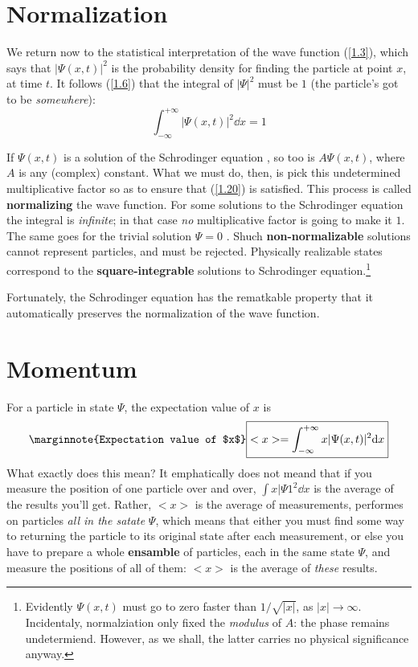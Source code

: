 \section{Normalization}
We return now to the statistical interpretation of the wave function (\ref{1.3}), which says that $|\Psi(x,t)|^2$ is the probability density for finding the particle at point $x$, at time $t$. It follows (\ref{1.6}) that the integral of $|\Psi|^2$ must be $1$ (the particle's got to be \textit{somewhere}):
\begin{equation}\label{1.20}
	\boxed{\int_{-\infty}^{+\infty}|\Psi(x,t)|^2\dd x=1}
\end{equation}

If $\Psi(x,t)$ is a solution of the Schrodinger equation , so too is $A\Psi(x,t)$, where $A$ is any (complex) constant. What we must do, then, is pick this undetermined multiplicative factor so as to ensure that (\ref{1.20}) is satisfied. This process is called \textbf{normalizing} the wave function. For some solutions to the Schrodinger equation the integral is \textit{infinite}; in that case \textit{no} multiplicative factor is going to make it $1$. The same goes for the trivial solution $\Psi=0$ . Shuch \textbf{non-normalizable} solutions cannot represent particles, and must be rejected. Physically realizable states correspond to the \textbf{square-integrable} solutions to Schrodinger equation.\footnote{Evidently $\Psi(x,t)$ must go to zero faster than $1/\sqrt{|x|}$, as $|x|\to\infty$. Incidentaly, normalziation only fixed the \textit{modulus} of $A$: the phase remains undetermiend. However, as we shall, the latter carries no physical significance anyway.}

Fortunately, the Schrodinger equation has the rematkable property that it automatically preserves the normalization of the wave function.

\section{Momentum}
For a particle in state $\Psi$, the expectation value of $x$ is 
\begin{equation}\label{1.28}\marginnote{Expectation value of $x$}
	\boxed{<x>=\int_{-\infty}^{+\infty}x|\Psi(x,t)|^2\dd x}
\end{equation}
What exactly does this mean? It emphatically does not meand that if you measure the position of one particle over and over, $\int x|\Psi1^2\dd x$ is the average of the results you'll get. Rather, $<x>$ is the average of measurements, performes on particles \textit{all in the satate} $\Psi$, which means that either you must find some way to returning the particle to its original state after each measurement, or else you have to prepare a whole \textbf{ensamble} of particles, each in the same state $\Psi$, and measure the positions of all of them: $<x>$ is the average of \textit{these} results. 

